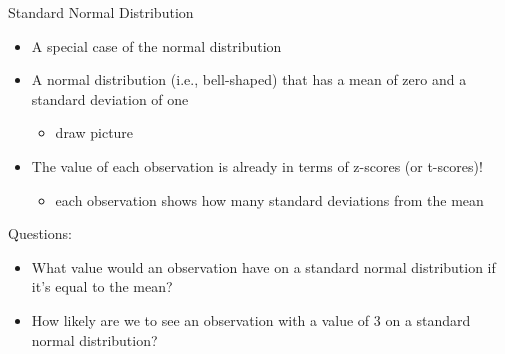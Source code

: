 \documentclass[
  8pt,
  ignorenonframetext,
  dvipsnames]{beamer}
\providecommand{\tightlist}{%
  \setlength{\itemsep}{0pt}\setlength{\parskip}{0pt}}
\let\olditem\item
\renewcommand{\item}{%
  \olditem\vspace{4pt}
}
\begin{document}
\begin{frame}{Standard Normal Distribution}
\protect\hypertarget{standard-normal-distribution}{}

\begin{itemize}
\tightlist
\item
  A special case of the normal distribution
\end{itemize}

\medskip

\begin{itemize}
\tightlist
\item
  A normal distribution (i.e., bell-shaped) that has a mean of zero and
  a standard deviation of one

  \begin{itemize}
  \tightlist
  \item
    draw picture
  \end{itemize}
\end{itemize}

\medskip

\begin{itemize}
\tightlist
\item
  The value of each observation is already in terms of z-scores (or
  t-scores)!

  \begin{itemize}
  \tightlist
  \item
    each observation shows how many standard deviations from the mean
  \end{itemize}
\end{itemize}

\medskip

Questions:

\begin{itemize}
\tightlist
\item
  What value would an observation have on a standard normal distribution
  if it's equal to the mean?
\item
  How likely are we to see an observation with a value of 3 on a
  standard normal distribution?
\end{itemize}

\end{frame}
\end{document}
